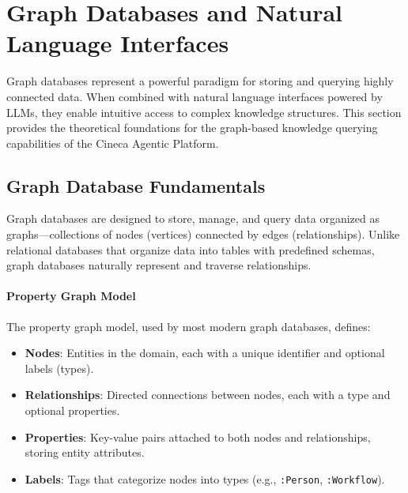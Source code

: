 %
%

\section{Graph Databases and Natural Language Interfaces}
\label{sec:graph-databases}

Graph databases represent a powerful paradigm for storing and querying highly connected data. When combined with natural language interfaces powered by LLMs, they enable intuitive access to complex knowledge structures. This section provides the theoretical foundations for the graph-based knowledge querying capabilities of the Cineca Agentic Platform.

\subsection{Graph Database Fundamentals}

Graph databases are designed to store, manage, and query data organized as graphs---collections of nodes (vertices) connected by edges (relationships). Unlike relational databases that organize data into tables with predefined schemas, graph databases naturally represent and traverse relationships.

\paragraph{Property Graph Model}

The property graph model, used by most modern graph databases, defines:

\begin{itemize}
    \item \textbf{Nodes}: Entities in the domain, each with a unique identifier and optional labels (types).
    \item \textbf{Relationships}: Directed connections between nodes, each with a type and optional properties.
    \item \textbf{Properties}: Key-value pairs attached to both nodes and relationships, storing entity attributes.
    \item \textbf{Labels}: Tags that categorize nodes into types (e.g., \texttt{:Person}, \texttt{:Workflow}).
\end{itemize}

